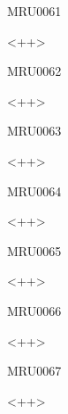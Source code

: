 \documentclass{article}
\begin{document}
\begin{corrige}{MRU0061}

<++>

\end{corrige}%


\begin{corrige}{MRU0062}

<++>

\end{corrige}%


\begin{corrige}{MRU0063}

<++>

\end{corrige}%


\begin{corrige}{MRU0064}

<++>

\end{corrige}%


\begin{corrige}{MRU0065}

<++>

\end{corrige}%


\begin{corrige}{MRU0066}

<++>

\end{corrige}%


\begin{corrige}{MRU0067}

<++>

\end{corrige}%
\end{document}
